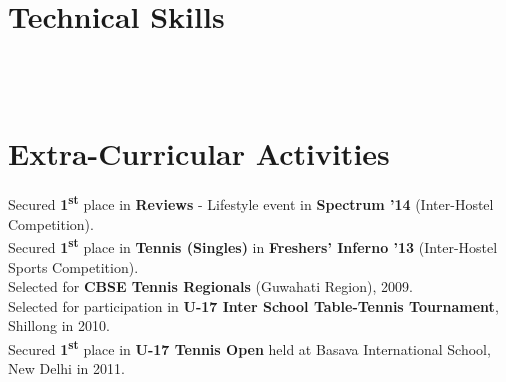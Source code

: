 \documentclass[a4paper]{norm-resume}
\begin{document}

\section{Technical Skills}

\vspace{2mm}	%

 \hfill {} \\
\vspace{1mm}	%
 \hfill {} \\
\vspace{1mm}	%
 \hfill {}

\vspace{1mm}	%


\section{Extra-Curricular Activities}

\vspace{1mm} %
	
	Secured \textbf{1\textsuperscript{st}} place in \textbf{Reviews} - Lifestyle event in \textbf{Spectrum '14} (Inter-Hostel Competition).\\
	Secured \textbf{1\textsuperscript{st}} place in \textbf{Tennis (Singles)} in \textbf{Freshers' Inferno '13} (Inter-Hostel Sports Competition).\\	
	Selected for \textbf{CBSE Tennis Regionals} (Guwahati Region), 2009.\\
	Selected for participation in \textbf{U-17 Inter School Table-Tennis Tournament}, Shillong in 2010.\\
	Secured \textbf{1\textsuperscript{st}} place in \textbf{U-17 Tennis Open} held at Basava International School, New Delhi in 2011.\\
\end{document}
